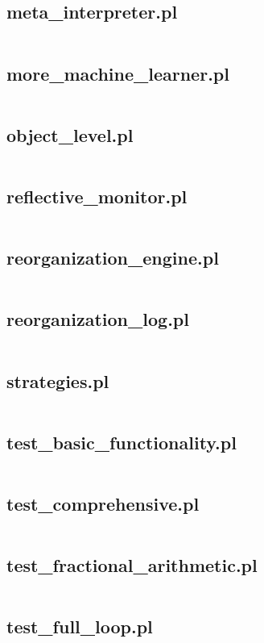 \documentclass{article}
\begin{document}
\subsection{meta\_interpreter.pl}
\inputminted{prolog}{meta_interpreter.pl}
\subsection{more\_machine\_learner.pl}
\inputminted{prolog}{more_machine_learner.pl}
\subsection{object\_level.pl}
\inputminted{prolog}{object_level.pl}
\subsection{reflective\_monitor.pl}
\inputminted{prolog}{reflective_monitor.pl}
\subsection{reorganization\_engine.pl}
\inputminted{prolog}{reorganization_engine.pl}
\subsection{reorganization\_log.pl}
\inputminted{prolog}{reorganization_log.pl}
\subsection{strategies.pl}
\inputminted{prolog}{strategies.pl}
\subsection{test\_basic\_functionality.pl}
\inputminted{prolog}{test_basic_functionality.pl}
\subsection{test\_comprehensive.pl}
\inputminted{prolog}{test_comprehensive.pl}
\subsection{test\_fractional\_arithmetic.pl}
\inputminted{prolog}{test_fractional_arithmetic.pl}
\subsection{test\_full\_loop.pl}
\inputminted{prolog}{test_full_loop.pl}
\end{document}
